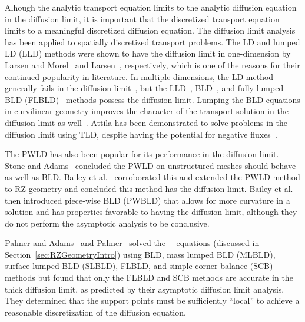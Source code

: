 \documentclass[12pt,letterpaper]{article}
\begin{document}
Alhough the analytic transport equation limits to the analytic diffusion equation in the diffusion limit, it is important that the discretized transport equation limits to a meaningful discretized diffusion equation. The diffusion limit analysis has been applied to spatially discretized transport problems. The LD and lumped LD (LLD) methods were shown to have the diffusion limit in one-dimension by Larsen and Morel~\cite{LarsenAsymptotic} and Larsen~\cite{LarsenAsymptoticDiffusionLimit}, respectively, which is one of the reasons for their continued popularity in literature. In multiple dimensions, the LD method generally fails in the diffusion limit~\cite{BorgersAsymptoticDiffLimit}, but the LLD~\cite{MorelLLDrz, MorelLLDTetrahedral}, BLD~\cite{Adams_Disc_FEM_Thick_Diff}, and fully lumped BLD (FLBLD)~\cite{AdamsDFEMDiffLimit} methods possess the diffusion limit. Lumping the BLD equations in curvilinear geometry improves the character of the transport solution in the diffusion limit as well~\cite{PalmerCurvilinearTransport, MorelLBLD}. Attila has been demonstrated to solve problems in the diffusion limit using TLD, despite having the potential for negative fluxes~\cite{AttilaUsersManual}.

The PWLD has also been popular for its performance in the diffusion limit. Stone and Adams~\cite{StonePLFEM} concluded the PWLD on unstructured meshes should behave as well as BLD. Bailey et al.~\cite{BaileyDFEMCylindrical, BaileyDissertation} corroborated this and extended the PWLD method to RZ geometry and concluded this method has the diffusion limit. Bailey et al.~\cite{BaileyBLDFEM} then introduced piece-wise BLD (PWBLD) that allows for more curvature in a solution and has properties favorable to having the diffusion limit, although they do not perform the asymptotic analysis to be conclusive.

Palmer and Adams~\cite{PalmerCurvilinearTransport} and Palmer~\cite{PalmerDissertation} solved the \RZ\ \SN\ equations (discussed in Section~\ref{sec:RZGeometryIntro}) using BLD, mass lumped BLD (MLBLD), surface lumped BLD (SLBLD), FLBLD, and simple corner balance (SCB) methods but found that only the FLBLD and SCB methods are accurate in the thick diffusion limit, as predicted by their asymptotic diffusion limit analysis. They determined that the support points must be sufficiently ``local'' to achieve a reasonable discretization of the diffusion equation.
\end{document}
